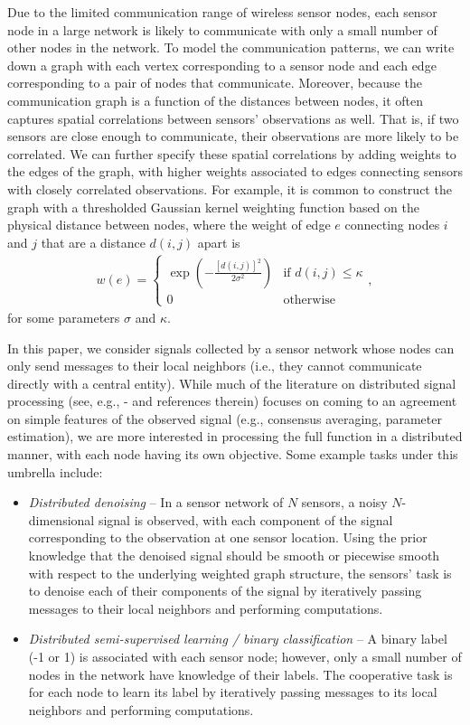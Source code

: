\documentclass[conference]{IEEEtran}
\begin{document}
Due to the limited communication range of wireless sensor nodes, each sensor node in a large network is likely to communicate with only a small number of other nodes in the network. To model the communication patterns, we can write down a graph with each vertex corresponding to a sensor node and each edge corresponding to a pair of nodes that communicate. Moreover, because the communication graph is a function of the distances between nodes, it often captures spatial correlations between sensors' observations as well.
 That is, if two sensors are close enough to communicate, their observations are more likely to be correlated.
We can further specify these spatial correlations by adding weights to the edges of the graph, with higher weights associated to edges connecting sensors with closely correlated observations. For example,
it is common to construct the graph with
a thresholded Gaussian kernel weighting function based on the physical distance between nodes, where the weight of edge $e$ connecting nodes $i$ and $j$ that are a distance $d(i,j)$ apart is \begin{eqnarray}\label{Eq:gkw}
w(e)=
\begin{cases}
\exp\left({-\frac{[d(i,j)]^2}{2\sigma^2}}\right) &\mbox{if } d(i,j) \leq \kappa \\
0 &\mbox{otherwise}
\end{cases},
\end{eqnarray}
for some parameters $\sigma$ and $\kappa$.

In this paper, we consider signals collected by a sensor network whose nodes can only send messages to their local neighbors
 (i.e., they cannot communicate directly with a central entity). While much of the literature on distributed signal processing (see, e.g., \cite{Rabbat}-\nocite{predd, olfati}\cite{dimakis} and references therein) focuses on coming to an agreement on simple features of the observed signal (e.g., consensus averaging, parameter estimation), we are more interested in processing the full function in a distributed manner, with each node having its own objective.
Some example tasks under this umbrella include:
\begin{itemize}
\item \emph{Distributed denoising} -- In a sensor network of $N$ sensors, a noisy $N$-dimensional signal is observed, with each component of the signal corresponding to the observation at one sensor location. Using the prior knowledge that the denoised signal should be smooth or piecewise smooth with respect to the underlying weighted graph structure, the sensors' task is to denoise each of their components of the signal by iteratively passing messages to their local neighbors and performing computations.
\item \emph{Distributed semi-supervised learning / binary classification} -- A binary label (-1 or 1) is associated with each sensor node; however, only a small number of nodes in the network have knowledge of their labels. The cooperative task is for each node to learn its label by iteratively passing messages to its local neighbors and performing computations.
\end{itemize}
\end{document}
